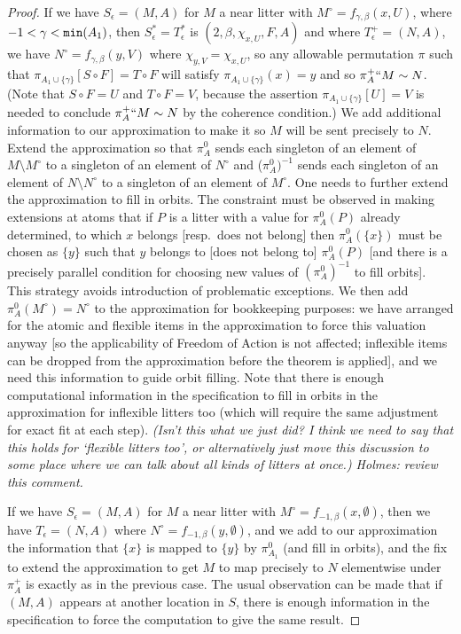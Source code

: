 \documentclass[112pt]{article}
\theoremstyle{definition}
\theoremstyle{remark}
\newcommand{\rk}[1]{{\color{blue}\sl #1}}
\begin{document}
\begin{proof}
If we have $S_\epsilon= (M,A)$ for $M$ a near litter with $M^\circ = f_{\gamma,\beta}(x,U)$, where $-1<\gamma<{\tt min}(A_1)$,
then $S^*_\epsilon=T^*_\epsilon$ is $(2,\beta,\chi_{x,U}, F,A)$ and where $T^+_\epsilon=(N,A)$,  we have $N^\circ = f_{\gamma,\beta}(y,V)$
where $\chi_{y,V} = \chi_{x,U}$, so any allowable permutation $\pi$ such that $\pi_{A_1 \cup \{\gamma\}}[S \circ F] = T \circ F$ will satisfy $\pi_{A_1 \cup \{\gamma\}}(x) = y$ and  so $\pi^+_A``M \sim N$.
{(Note that $S \circ F = U$ and $T \circ F = V$, because the assertion $\pi_{A_1 \cup \{\gamma\}}[U] = V$ is needed to conclude $\pi^+_A``M \sim N$ by the coherence condition.)}
We add additional information to our approximation to make it so $M$ will be sent precisely to $N$.
Extend the approximation so that $\pi^0_{A}$ sends each singleton of an element of $M\setminus M^\circ$ to a singleton of an element of $N^\circ$ and ($\pi^0_A)^{-1}$ sends each singleton of an element of $N\setminus N^\circ$ to a singleton of an  element of $M^\circ$.  One needs to further extend the approximation to fill in orbits.  The constraint must be observed in making extensions at atoms  that if $P$ is a litter with a value for
$\pi^0_A(P)$ already determined, to which $x$ belongs [resp.\ does not belong] then $\pi^0_A(\{x\})$ must be chosen as $\{y\}$ such that
$y$ belongs to [does not belong to] $\pi^0_A(P)$ [and there is a precisely parallel condition for choosing new values of $(\pi^0_A)^{-1}$ to fill orbits].  %
  This strategy avoids introduction of problematic exceptions.  We then add $\pi^0_A(M^\circ) = N^\circ$ to the approximation for bookkeeping purposes:  we have arranged for the atomic and flexible items in the approximation to force this valuation anyway [so the applicability of Freedom of Action is not affected; inflexible items can be dropped from the approximation before the theorem  is applied], and we need this information to guide orbit filling.
Note that there is enough computational information in the specification to fill in orbits in the approximation for inflexible litters too (which will require the same adjustment for exact fit at each step). \rk{(Isn't this what we just did? I think we need to say that this holds for `flexible litters too', or alternatively just move this discussion to some place where we can talk about all kinds of litters at once.)  Holmes: review this comment.}

If we have $S_\epsilon= (M,A)$ for $M$ a near litter with $M^\circ = f_{-1,\beta}(x,\emptyset)$, then we have $T_\epsilon=(N,A)$
where  $N^\circ = f_{-1,\beta}(y,\emptyset)$, and we add to our approximation the information that $\{x\}$ is mapped to
$\{y\}$ by $\pi^0_{A_1}$ (and fill in orbits), and the fix to extend the approximation to get $M$ to map precisely to $N$ elementwise under $\pi^+_A$ is exactly as in the previous case.  The usual observation can be made that if $(M,A)$ appears at another location in $S$, there is enough information in the specification to force the computation to give the same result.


\end{proof}
\end{document}
